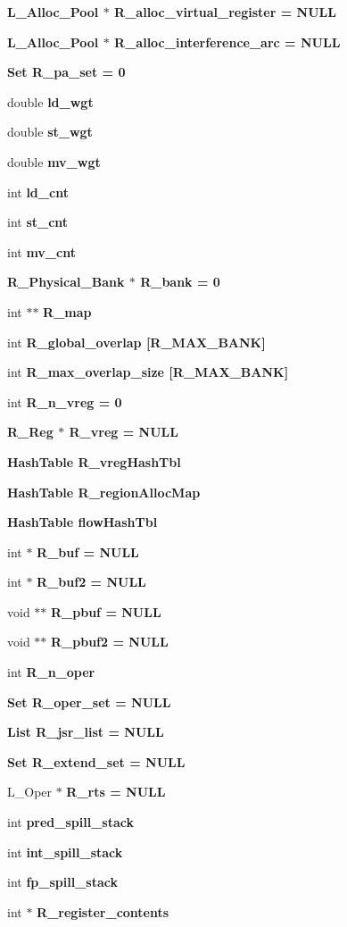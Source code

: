 \begin{CompactItemize}
\bf{L\_\-Alloc\_\-Pool} $\ast$ \bf{R\_\-alloc\_\-virtual\_\-register} = \bf{NULL}
\item 
\bf{L\_\-Alloc\_\-Pool} $\ast$ \bf{R\_\-alloc\_\-interference\_\-arc} = \bf{NULL}
\item 
\bf{Set} \bf{R\_\-pa\_\-set} = 0
\item 
double \bf{ld\_\-wgt}
\item 
double \bf{st\_\-wgt}
\item 
double \bf{mv\_\-wgt}
\item 
int \bf{ld\_\-cnt}
\item 
int \bf{st\_\-cnt}
\item 
int \bf{mv\_\-cnt}
\item 
\bf{R\_\-Physical\_\-Bank} $\ast$ \bf{R\_\-bank} = 0
\item 
int $\ast$$\ast$ \bf{R\_\-map}
\item 
int \bf{R\_\-global\_\-overlap} [R\_\-MAX\_\-BANK]
\item 
int \bf{R\_\-max\_\-overlap\_\-size} [R\_\-MAX\_\-BANK]
\item 
int \bf{R\_\-n\_\-vreg} = 0
\item 
\bf{R\_\-Reg} $\ast$ \bf{R\_\-vreg} = \bf{NULL}
\item 
\bf{Hash\-Table} \bf{R\_\-vreg\-Hash\-Tbl}
\item 
\bf{Hash\-Table} \bf{R\_\-region\-Alloc\-Map}
\item 
\bf{Hash\-Table} \bf{flow\-Hash\-Tbl}
\item 
int $\ast$ \bf{R\_\-buf} = \bf{NULL}
\item 
int $\ast$ \bf{R\_\-buf2} = \bf{NULL}
\item 
void $\ast$$\ast$ \bf{R\_\-pbuf} = \bf{NULL}
\item 
void $\ast$$\ast$ \bf{R\_\-pbuf2} = \bf{NULL}
\item 
int \bf{R\_\-n\_\-oper}
\item 
\bf{Set} \bf{R\_\-oper\_\-set} = \bf{NULL}
\item 
\bf{List} \bf{R\_\-jsr\_\-list} = \bf{NULL}
\item 
\bf{Set} \bf{R\_\-extend\_\-set} = \bf{NULL}
\item 
L\_\-Oper $\ast$ \bf{R\_\-rts} = \bf{NULL}
\item 
int \bf{pred\_\-spill\_\-stack}
\item 
int \bf{int\_\-spill\_\-stack}
\item 
int \bf{fp\_\-spill\_\-stack}
\item 
int $\ast$ \bf{R\_\-register\_\-contents}
$$
\end{CompactItemize}
